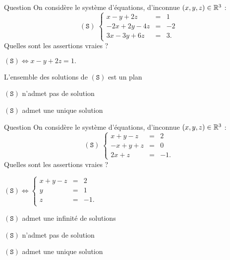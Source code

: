 \begin{multi}[multiple,feedback=
{\( (\mathtt{S}) \Leftrightarrow  
x-y+2z=0\).
L'ensemble des solutions de \((\mathtt{S})\) est un plan.
}]{Question}
On considère le système d'équations, d'inconnue \((x,y,z)\in \mathbb{R}^3\) : 
\[(\mathtt{S})  \; \left\{\begin{array}{rcc}
x-y+2z&=&1\\
-2x+2y-4z&=&-2\\
3x-3y+6z&=&3.\end{array}\right.\]
Quelles sont les assertions vraies ?

    \item* \((\mathtt{S}) \Leftrightarrow
x-y+2z=1.\)
    \item* L'ensemble des solutions de \((\mathtt{S})\) est un plan
    \item \((\mathtt{S})\) n'admet pas de solution
    \item \((\mathtt{S})\) admet une unique solution
\end{multi}


\begin{multi}[multiple,feedback=
{\[(\mathtt{S}) \Leftrightarrow  \left\{\begin{array}{rcc}
x+y-z&=&2\\
y&=&1\\ 
z&=&-1.\end{array}\right.\] 
Donc \((\mathtt{S})\) admet une unique solution : \((0,1,-1)\).
}]{Question}
On considère le système d'équations, d'inconnue \((x,y,z)\in \mathbb{R}^3\) :  
\[(\mathtt{S}) \; \left\{\begin{array}{rcc}
x+y-z&=&2\\
-x+y+z&=&0\\
2x+z&=&-1.\end{array}\right.\]
Quelles sont les assertions vraies ?

    \item* \((\mathtt{S}) \Leftrightarrow  \left\{\begin{array}{rcc}
x+y-z&=&2\\
y&=&1\\
z&=&-1.\\
\end{array}\right.\)
    \item \((\mathtt{S})\) admet une infinité de solutions
    \item \((\mathtt{S})\) n'admet pas de solution
    \item* \((\mathtt{S})\) admet une unique solution
\end{multi}


